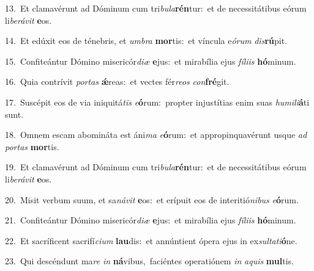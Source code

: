 {\numbfont\textcolor{\numbcolor}{13.}}~Et clamavérunt ad Dóminum cum tri\-\textit{bu}\-\textit{la}\textbf{rén}tur:~\star et de necessitátibus eórum li\-\textit{be}\-\textit{rá}\textit{vit} \textbf{e}\-os.\par
{\numbfont\textcolor{\numbcolor}{14.}}~Et edúxit eos de ténebris, et \textit{um}\-\textit{bra} \textbf{mor}\-tis:~\star et víncula e\-\textit{ó}\-\textit{rum} \textit{dis}\-\textbf{rú}pit.\par
{\numbfont\textcolor{\numbcolor}{15.}}~Confiteántur Dómino misericór\-\textit{di}\-\textit{æ} \textbf{e}\-jus:~\star et mirabília ejus \textit{fí}\-\textit{li}\textit{is} \textbf{hó}\-minum.\par
{\numbfont\textcolor{\numbcolor}{16.}}~Quia contrívit \textit{por}\-\textit{tas} \textbf{ǽ}\-reas:~\star et vectes fér\-\textit{re}\-\textit{os} \textit{con}\-\textbf{fré}git.\par
{\numbfont\textcolor{\numbcolor}{17.}}~Suscépit eos de via iniquitá\textit{tis} \textit{e}\-\textbf{ó}rum:~\star propter injustítias enim suas \textit{hu}\-\textit{mi}\textit{li}\textbf{á}ti sunt.\par
{\numbfont\textcolor{\numbcolor}{18.}}~Omnem escam abomináta est áni\textit{ma} \textit{e}\-\textbf{ó}rum:~\star et appropinquavérunt usque \textit{ad} \textit{por}\-\textit{tas} \textbf{mor}\-tis.\par
{\numbfont\textcolor{\numbcolor}{19.}}~Et clamavérunt ad Dóminum cum tri\-\textit{bu}\-\textit{la}\textbf{rén}tur:~\star et de necessitátibus eórum li\-\textit{be}\-\textit{rá}\textit{vit} \textbf{e}\-os.\par
{\numbfont\textcolor{\numbcolor}{20.}}~Misit verbum suum, et sa\-\textit{ná}\-\textit{vit} \textbf{e}\-os:~\star et erípuit eos de interitió\-\textit{ni}\-\textit{bus} \textit{e}\-\textbf{ó}rum.\par
{\numbfont\textcolor{\numbcolor}{21.}}~Confiteántur Dómino misericór\-\textit{di}\-\textit{æ} \textbf{e}\-jus:~\star et mirabília ejus \textit{fí}\-\textit{li}\textit{is} \textbf{hó}\-minum.\par
{\numbfont\textcolor{\numbcolor}{22.}}~Et sacríficent sacrifí\-\textit{ci}\-\textit{um} \textbf{lau}\-dis:~\star et annúntient ópera ejus in ex\-\textit{sul}\-\textit{ta}\textit{ti}\textbf{ó}ne.\par
{\numbfont\textcolor{\numbcolor}{23.}}~Qui descéndunt ma\textit{re} \textit{in} \textbf{ná}\-vibus,~\star faciéntes operatiónem \textit{in} \textit{a}\-\textit{quis} \textbf{mul}\-tis.\par

